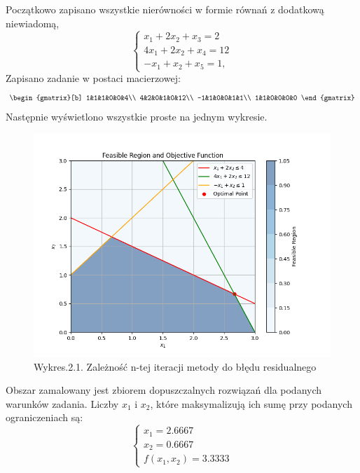 \documentclass{article}
\begin{document}
Początkowo zapisano wszystkie nierówności w formie równań z dodatkową niewiadomą,
\begin{equation}
    \begin{cases}
      x_{1}+2x_{2}+x_3 = 2 \\
     4x_{1} + 2x_{2}+x_4 = 12\\
     -x_1 + x_2 + x_5 = 1, 
    \end{cases}
  \end{equation}
  Zapisano zadanie w postaci macierzowej:
  \begin{equation}
    \begin{gmatrix}[b]
      1&1&1&0&0&4\\
      4&2&0&1&0&12\\
      -1&1&0&0&1&1\\
      1&1&0&0&0&0
    \end{gmatrix}
  \end{equation}
Następnie wyświetlono wszystkie proste na jednym wykresie.\newpage
\begin{figure}[h]
    \includegraphics[scale=0.5]{Simplex1.png}
    \centering
    \captionsetup[Tabela]{name=New Table Name}
    \caption*{Wykres.2.1. Zależność n-tej iteracji metody do błędu residualnego}
  \end{figure}
  Obszar zamalowany jest zbiorem dopuszczalnych rozwiązań dla podanych warunków zadania.
  Liczby $x_1$ i $x_2$, które maksymalizują ich sumę przy podanych ograniczeniach są:
  \begin{equation}
    \begin{cases}
      x_1 = 2.6667\\
      x_2 = 0.6667\\
      f(x_1,x_2) = 3.3333
    \end{cases}
  \end{equation}
\end{document}
